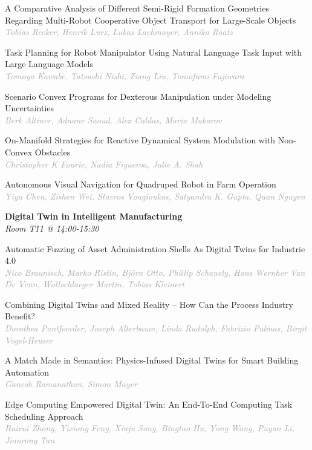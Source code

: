 \begin{multicols*}{2}
\small A Comparative Analysis of Different Semi-Rigid Formation Geometries Regarding Multi-Robot Cooperative Object Transport for Large-Scale Objects\\ 
\footnotesize \textcolor{darkgray}{\textit{Tobias Recker, Henrik  Lurz, Lukas  Lachmayer, Annika  Raatz}}

\small Task Planning for Robot Manipulator Using Natural Language Task Input with Large Language Models\\ 
\footnotesize \textcolor{darkgray}{\textit{Tomoya Kawabe, Tatsushi  Nishi, Ziang  Liu, Tomofumi  Fujiwara}}

\small Scenario Convex Programs for Dexterous Manipulation under Modeling Uncertainties\\ 
\footnotesize \textcolor{darkgray}{\textit{Berk Altiner, Adnane  Saoud, Alex  Caldas, Maria  Makarov}}

\small On-Manifold Strategies for Reactive Dynamical System Modulation with Non-Convex Obstacles\\ 
\footnotesize \textcolor{darkgray}{\textit{Christopher K Fourie, Nadia  Figueroa, Julie A.  Shah}}

\small Autonomous Visual Navigation for Quadruped Robot in Farm Operation\\ 
\footnotesize \textcolor{darkgray}{\textit{Yiyu Chen, Zishen  Wei, Stavros  Vougioukas, Satyandra K.  Gupta, Quan  Nguyen}}

\normalsize \textbf{Digital Twin in Intelligent Manufacturing}\\
\small \textit{Room T11 @ 14:00-15:30}

\small Automatic Fuzzing of Asset Administration Shells As Digital Twins for Industrie 4.0\\ 
\footnotesize \textcolor{darkgray}{\textit{Nico Braunisch, Marko  Ristin, Björn  Otto, Phillip  Schanely, Hans Wernher  Van De Venn, Wollschlaeger  Martin, Tobias  Kleinert}}

\small Combining Digital Twins and Mixed Reality -- How Can the Process Industry Benefit?\\ 
\footnotesize \textcolor{darkgray}{\textit{Dorothea Pantfoerder, Joseph  Alterbaum, Linda  Rudolph, Fabrizio  Palmas, Birgit  Vogel-Heuser}}

\small A Match Made in Semantics: Physics-Infused Digital Twins for Smart Building Automation\\ 
\footnotesize \textcolor{darkgray}{\textit{Ganesh Ramanathan, Simon  Mayer}}

\small Edge Computing Empowered Digital Twin: An End-To-End Computing Task Scheduling Approach\\ 
\footnotesize \textcolor{darkgray}{\textit{Ruirui Zhong, Yixiong  Feng, Xiuju  Song, Bingtao  Hu, Yong  Wang, Puyan  Li, Jianrong  Tan}}


\end{multicols*}
